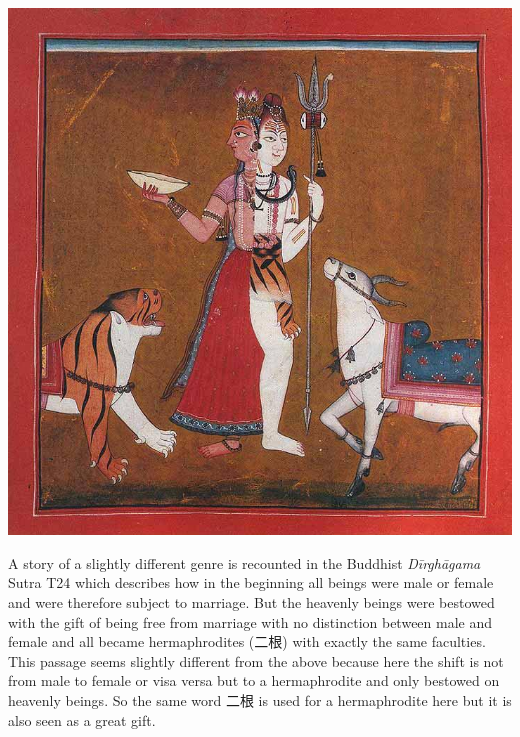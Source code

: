 \bigskip
\includegraphics[width=\textwidth]{androgyne.jpg}
\begin{minipage}{\textwidth}
\end{minipage}
\label{siva}

A story of a slightly different genre is recounted in the Buddhist {\em Dīrghāgama} Sutra T24 which describes how in the beginning all beings were male or female and were therefore subject to marriage. But the heavenly beings were bestowed with the gift of being free from marriage with no distinction between male and female and all became hermaphrodites (二根) with exactly the same faculties. This passage seems slightly different from the above because here the shift is not from male to female or visa versa but to a hermaphrodite and only bestowed on heavenly beings. So the same word 二根 is used for a hermaphrodite here but it is also seen as a great gift.

